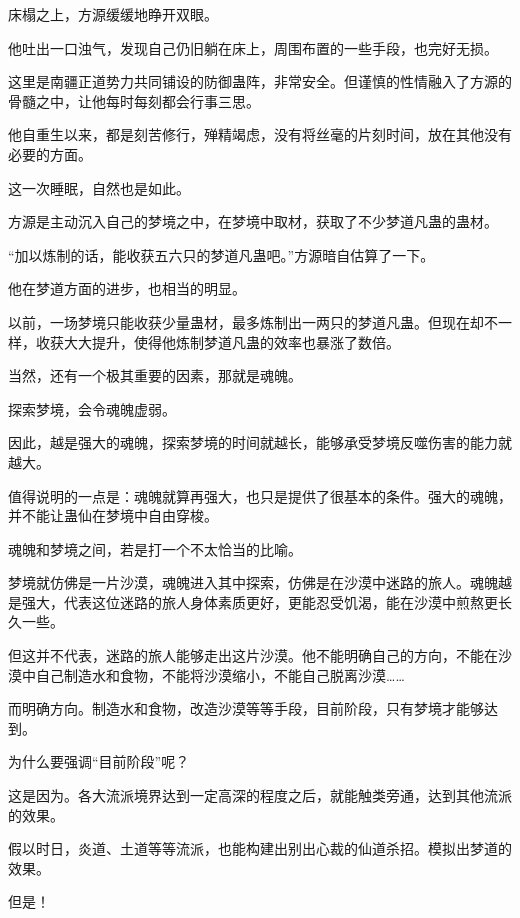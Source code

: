 
\begin{this_body}

床榻之上，方源缓缓地睁开双眼。

他吐出一口浊气，发现自己仍旧躺在床上，周围布置的一些手段，也完好无损。

这里是南疆正道势力共同铺设的防御蛊阵，非常安全。但谨慎的性情融入了方源的骨髓之中，让他每时每刻都会行事三思。

他自重生以来，都是刻苦修行，殚精竭虑，没有将丝毫的片刻时间，放在其他没有必要的方面。

这一次睡眠，自然也是如此。

方源是主动沉入自己的梦境之中，在梦境中取材，获取了不少梦道凡蛊的蛊材。

“加以炼制的话，能收获五六只的梦道凡蛊吧。”方源暗自估算了一下。

他在梦道方面的进步，也相当的明显。

以前，一场梦境只能收获少量蛊材，最多炼制出一两只的梦道凡蛊。但现在却不一样，收获大大提升，使得他炼制梦道凡蛊的效率也暴涨了数倍。

当然，还有一个极其重要的因素，那就是魂魄。

探索梦境，会令魂魄虚弱。

因此，越是强大的魂魄，探索梦境的时间就越长，能够承受梦境反噬伤害的能力就越大。

值得说明的一点是：魂魄就算再强大，也只是提供了很基本的条件。强大的魂魄，并不能让蛊仙在梦境中自由穿梭。

魂魄和梦境之间，若是打一个不太恰当的比喻。

梦境就仿佛是一片沙漠，魂魄进入其中探索，仿佛是在沙漠中迷路的旅人。魂魄越是强大，代表这位迷路的旅人身体素质更好，更能忍受饥渴，能在沙漠中煎熬更长久一些。

但这并不代表，迷路的旅人能够走出这片沙漠。他不能明确自己的方向，不能在沙漠中自己制造水和食物，不能将沙漠缩小，不能自己脱离沙漠……

而明确方向。制造水和食物，改造沙漠等等手段，目前阶段，只有梦境才能够达到。

为什么要强调“目前阶段”呢？

这是因为。各大流派境界达到一定高深的程度之后，就能触类旁通，达到其他流派的效果。

假以时日，炎道、土道等等流派，也能构建出别出心裁的仙道杀招。模拟出梦道的效果。

但是！


\end{this_body}
